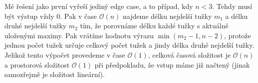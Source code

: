 \documentclass{fkssolpub}
\author{Ondřej Sedláček}
\begin{document}
Mé řešení jako první vyřeší jediný edge case, a to případ, kdy $n < 3$. Tehdy musí
být výstup vždy 0. Pak v čase $\mathcal{O}(n)$ najdeme délku nejdelší tužky $m_1$ a
délku druhé nejdelší tužky $m_2$ tím, že porovnáme délku každé tužky s aktuálně uloženými
maximy. Pak vrátíme hodnotu výrazu $\min (m_2 - 1, n - 2)$, protože jednou počet
tužek určuje celkový počet tužek a jindy délka druhé nejdelší tužky. Jelikož tento
výpočet provedeme v čase $\mathcal{O}(1)$, celková časová složitost je $\mathcal{O}(n)$
a prostorová složitost $\mathcal{O}(1)$ při předpokladu, že vstup máme již načtený (jinak
samozřejmě je složitost lineární).
\end{document}

